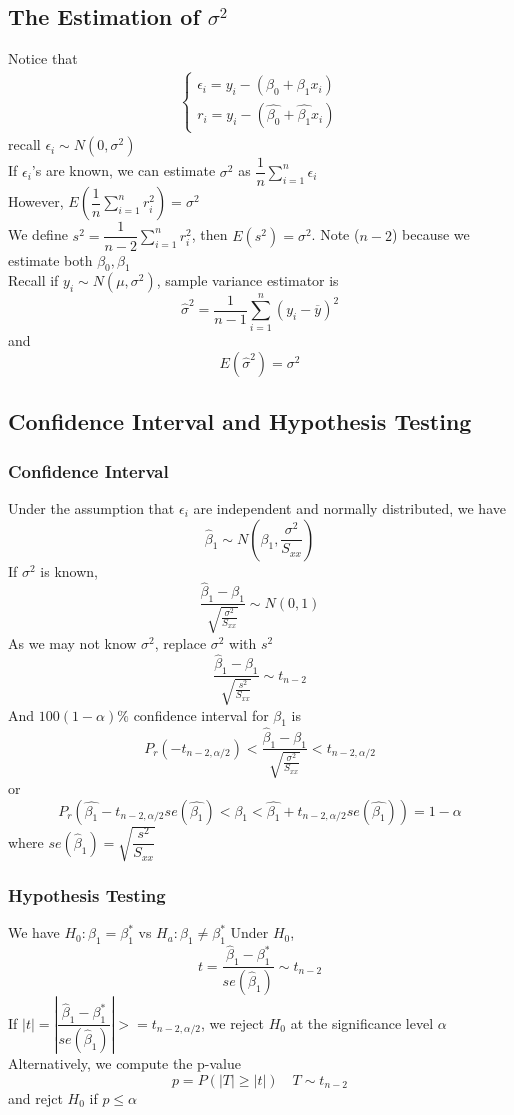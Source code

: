 \documentclass[11pt]{article}
\begin{document}
\subsection{The Estimation of $\sigma^2$}
Notice that 
\begin{align*}
    \begin{cases}
        \epsilon_i = y_i-(\beta_0+\beta_1x_i) \\
        r_i = y_i - (\hat{\beta_0}+\hat{\beta_1}x_i)
    \end{cases}
\end{align*}
recall $\epsilon_i\sim N(0,\sigma^2)$ \\
If $\epsilon_i$'s are known, we can estimate $\sigma^2$ as $\dfrac{1}{n}\sum_{i=1}^{n}\epsilon_i$ \\
However, $E(\dfrac{1}{n}\sum_{i=1}^{n}r_i^2)=\sigma^2$ \\
We define $s^2=\dfrac{1}{n-2}\sum_{i=1}^{n}r_i^2$, then $E(s^2)=\sigma^2$. Note ($n-2$) because we estimate both $\beta_0,\beta_1$ \\
Recall if $y_i\sim N(\mu,\sigma^2)$, sample variance estimator is 
\[\hat{\sigma}^2=\frac{1}{n-1}\sum_{i=1}^{n}(y_i-\overline{y})^2\]
and \[E(\hat{\sigma}^2) = \sigma^2\]
\subsection{Confidence Interval and Hypothesis Testing}
\subsubsection{Confidence Interval}
Under the assumption that $\epsilon_i$ are independent and normally distributed, we have 
\[\hat{\beta}_1\sim N(\beta_1,\frac{\sigma^2}{S_{xx}})\]
If $\sigma^2$ is known, \[\frac{\hat{\beta}_1-\beta_1}{\sqrt{\frac{\sigma^2}{S_{xx}}}}\sim N(0,1)\]
As we may not know $\sigma^2$, replace $\sigma^2$ with $s^2$
\[\frac{\hat{\beta}_1-\beta_1}{\sqrt{\frac{s^2}{S_{xx}}}}\sim t_{n-2}\]
And $100(1-\alpha)\%$ confidence interval for $\beta_1$ is 
\[P_r(-t_{n-2,\alpha/2})<\frac{\hat{\beta}_1-\beta_1}{\sqrt{\frac{\sigma^2}{S_{xx}}}}<t_{n-2,\alpha/2}\]
or \[P_r(\hat{\beta_1}-t_{n-2,\alpha/2}se(\hat{\beta_1})<\beta_1<\hat{\beta_1}+t_{n-2,\alpha/2}se(\hat{\beta_1}))=1-\alpha\]
where $se(\hat{\beta}_1) = \sqrt{\dfrac{s^2}{S_{xx}}}$
\subsubsection{Hypothesis Testing}
We have $H_0: \beta_1=\beta_1^*$ vs $H_a:\beta_1\neq\beta_1^*$
Under $H_0$, \[t=\frac{\hat{\beta}_1-\beta_1^*}{se(\hat{\beta}_1)}\sim t_{n-2}\]
If $|t|=|\dfrac{\hat{\beta}_1-\beta_1^*}{se(\hat{\beta}_1)}|>=t_{n-2,\alpha/2}$, we reject $H_0$ at the significance level $\alpha$ \\
Alternatively, we compute the p-value 
\[p=P(|T|\geq|t|)\quad T\sim t_{n-2}\]
and rejct $H_0$ if $p\leq\alpha$
\end{document}
